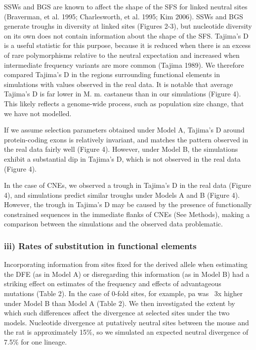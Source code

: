 SSWs and BGS are known to affect the shape of the SFS for linked neutral sites (Braverman, et al. 1995; Charlesworth, et al. 1995; Kim 2006). SSWs and BGS generate troughs in diversity at linked sites (Figures 2-3), but nucleotide diversity on its own does not contain information about the shape of the SFS. Tajima’s D is a useful statistic for this purpose, because it is reduced when there is an excess of rare polymorphisms relative to the neutral expectation and increased when intermediate frequency variants are more common (Tajima 1989). We therefore compared Tajima’s D in the regions surrounding functional elements in simulations with values observed in the real data. It is notable that average Tajima’s D is far lower in M. m. castaneus than in our simulations (Figure 4). This likely reflects a genome-wide process, such as population size change, that we have not modelled.

If we assume selection parameters obtained under Model A, Tajima’s D around protein-coding exons is relatively invariant, and matches the pattern observed in the real data fairly well (Figure 4). However, under Model B, the simulations exhibit a substantial dip in Tajima’s D, which is not observed in the real data (Figure 4).

In the case of CNEs, we observed a trough in Tajima’s D in the real data (Figure 4), and simulations predict similar troughs under Models A and B (Figure 4). However, the trough in Tajima’s D may be caused by the presence of functionally constrained sequences in the immediate flanks of CNEs (See Methods), making a comparison between the simulations and the observed data problematic.

\subsubsection{iii) Rates of substitution in functional elements}

Incorporating information from sites fixed for the derived allele when estimating the DFE (as in Model A) or disregarding this information (as in Model B) had a striking effect on estimates of the frequency and effects of advantageous mutations (Table 2). In the case of 0-fold sites, for example, pa was ~3x higher under Model B than Model A (Table 2). We then investigated the extent by which such differences affect the divergence at selected sites under the two models. Nucleotide divergence at putatively neutral sites between the mouse and the rat is approximately 15\%, so we simulated an expected neutral divergence of 7.5\% for one lineage. 

